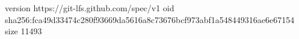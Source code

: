 version https://git-lfs.github.com/spec/v1
oid sha256:fca49d33474c280f93669da5616a8c73676bcf973abf1a548449316ae6e67154
size 11493
